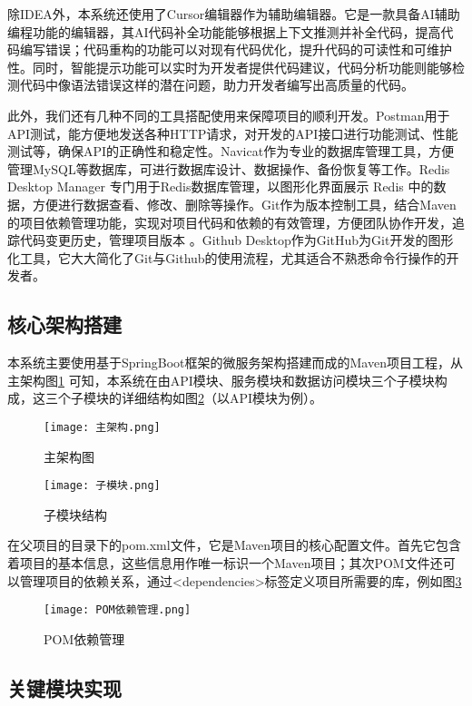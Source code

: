 除IDEA外，本系统还使用了Cursor编辑器作为辅助编辑器。它是一款具备AI辅助编程功能的编辑器，其AI代码补全功能能够根据上下文推测并补全代码，提高代码编写错误；代码重构的功能可以对现有代码优化，提升代码的可读性和可维护性。同时，智能提示功能可以实时为开发者提供代码建议，代码分析功能则能够检测代码中像语法错误这样的潜在问题，助力开发者编写出高质量的代码。

此外，我们还有几种不同的工具搭配使用来保障项目的顺利开发。Postman用于API测试，能方便地发送各种HTTP请求，对开发的API接口进行功能测试、性能测试等，确保API的正确性和稳定性。Navicat作为专业的数据库管理工具，方便管理MySQL等数据库，可进行数据库设计、数据操作、备份恢复等工作。Redis Desktop Manager 专门用于Redis数据库管理，以图形化界面展示 Redis 中的数据，方便进行数据查看、修改、删除等操作。Git作为版本控制工具，结合Maven的项目依赖管理功能，实现对项目代码和依赖的有效管理，方便团队协作开发，追踪代码变更历史，管理项目版本 。Github Desktop作为GitHub为Git开发的图形化工具，它大大简化了Git与Github的使用流程，尤其适合不熟悉命令行操作的开发者。

\subsection{核心架构搭建}

本系统主要使用基于SpringBoot框架的微服务架构搭建而成的Maven项目工程，从主架构图\ref{主架构图}
可知，本系统在由API模块、服务模块和数据访问模块三个子模块构成，这三个子模块的详细结构如图\ref{子模块结构}（以API模块为例）。
\begin{figure}[hbt]
    \centering
    \texttt{[image: 主架构.png]}
    \caption{主架构图}
    \label{主架构图}
\end{figure}

\begin{figure}[hbt]
    \centering
    \texttt{[image: 子模块.png]}
    \caption{子模块结构}
    \label{子模块结构}
\end{figure}

在父项目的目录下的pom.xml文件，它是Maven项目的核心配置文件。首先它包含着项目的基本信息，这些信息用作唯一标识一个Maven项目；其次POM文件还可以管理项目的依赖关系，通过<dependencies>标签定义项目所需要的库，例如图\ref{POM依赖管理}

\begin{figure}[hbt]
    \centering
    \texttt{[image: POM依赖管理.png]}
    \caption{POM依赖管理}
    \label{POM依赖管理}
\end{figure}

\subsection{关键模块实现}

